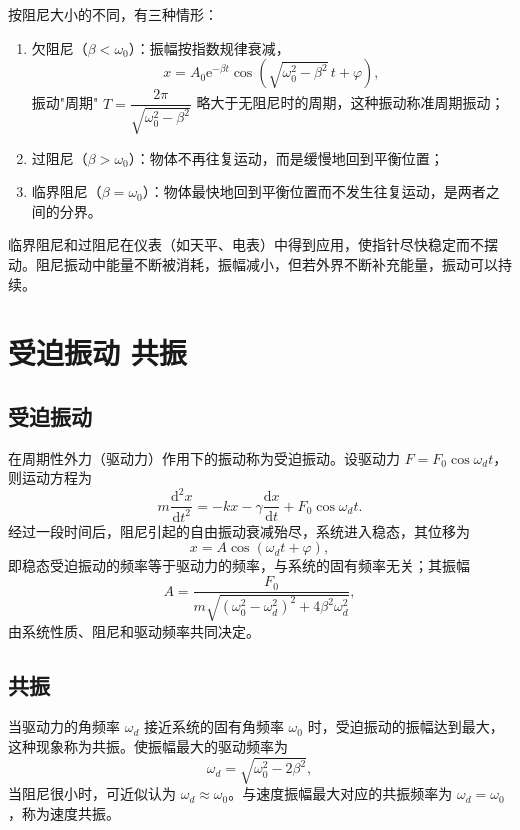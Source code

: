     按阻尼大小的不同，有三种情形：
    \begin{enumerate}
        \item 欠阻尼（$\beta<\omega_0$）：振幅按指数规律衰减，
        \[
        x=A_0\mathrm{e}^{-\beta t}\cos\left(\sqrt{\omega_0^{2}-\beta^{2}}\,t+\varphi\right),
        \]
        振动"周期" $T=\dfrac{2\pi}{\sqrt{\omega_0^{2}-\beta^{2}}}$ 略大于无阻尼时的周期，这种振动称准周期振动；
        \item 过阻尼（$\beta>\omega_0$）：物体不再往复运动，而是缓慢地回到平衡位置；
        \item 临界阻尼（$\beta=\omega_0$）：物体最快地回到平衡位置而不发生往复运动，是两者之间的分界。
    \end{enumerate}
    临界阻尼和过阻尼在仪表（如天平、电表）中得到应用，使指针尽快稳定而不摆动。阻尼振动中能量不断被消耗，振幅减小，但若外界不断补充能量，振动可以持续。


\section{受迫振动 共振}
    \subsection{受迫振动}
    在周期性外力（驱动力）作用下的振动称为受迫振动。设驱动力 $F=F_0\cos\omega_d t$，则运动方程为
    \[
    m\frac{\mathrm{d}^{2}x}{\mathrm{d}t^{2}}=-kx-\gamma\frac{\mathrm{d}x}{\mathrm{d}t}+F_0\cos\omega_d t.
    \]
    经过一段时间后，阻尼引起的自由振动衰减殆尽，系统进入稳态，其位移为
    \[
    x=A\cos(\omega_d t+\varphi),
    \]
    即稳态受迫振动的频率等于驱动力的频率，与系统的固有频率无关；其振幅
    \[
    A=\frac{F_0}{m\sqrt{(\omega_0^{2}-\omega_d^{2})^{2}+4\beta^{2}\omega_d^{2}}},
    \]
    由系统性质、阻尼和驱动频率共同决定。

    \subsection{共振}
    当驱动力的角频率 $\omega_d$ 接近系统的固有角频率 $\omega_0$ 时，受迫振动的振幅达到最大，这种现象称为共振。使振幅最大的驱动频率为
    \[
    \omega_d=\sqrt{\omega_0^{2}-2\beta^{2}},
    \]
    当阻尼很小时，可近似认为 $\omega_d\approx\omega_0$。与速度振幅最大对应的共振频率为 $\omega_d=\omega_0$，称为速度共振。

